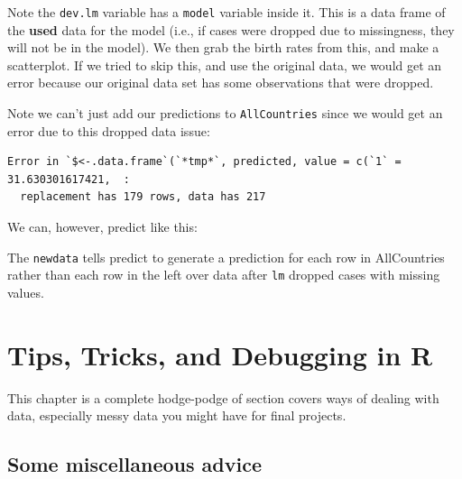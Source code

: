 \documentclass[
  letterpaper,
  DIV=11,
  numbers=noendperiod]{scrreprt}
\newenvironment{Shaded}{\begin{snugshade}}{\end{snugshade}}
\newcommand{\AttributeTok}[1]{\textcolor[rgb]{0.49,0.56,0.16}{#1}}
\newcommand{\FunctionTok}[1]{\textcolor[rgb]{0.02,0.16,0.49}{#1}}
\newcommand{\NormalTok}[1]{\textcolor[rgb]{0.00,0.44,0.13}{#1}}
\newcommand{\OtherTok}[1]{\textcolor[rgb]{0.00,0.44,0.13}{#1}}
\newcommand{\SpecialCharTok}[1]{\textcolor[rgb]{0.25,0.44,0.63}{#1}}
\begin{document}
Note the \texttt{dev.lm} variable has a \texttt{model} variable inside
it. This is a data frame of the \textbf{used} data for the model (i.e.,
if cases were dropped due to missingness, they will not be in the
model). We then grab the birth rates from this, and make a scatterplot.
If we tried to skip this, and use the original data, we would get an
error because our original data set has some observations that were
dropped.

Note we can't just add our predictions to \texttt{AllCountries} since we
would get an error due to this dropped data issue:

\begin{Shaded}
\end{Shaded}

\begin{verbatim}
Error in `$<-.data.frame`(`*tmp*`, predicted, value = c(`1` = 31.630301617421,  : 
  replacement has 179 rows, data has 217
\end{verbatim}

We can, however, predict like this:

\begin{Shaded}
\end{Shaded}

The \texttt{newdata} tells predict to generate a prediction for each row
in AllCountries rather than each row in the left over data after
\texttt{lm} dropped cases with missing values.

\hypertarget{tips-tricks-and-debugging-in-r}{%
\chapter{Tips, Tricks, and Debugging in
R}\label{tips-tricks-and-debugging-in-r}}

This chapter is a complete hodge-podge of section covers ways of dealing
with data, especially messy data you might have for final projects.

\hypertarget{some-miscellaneous-advice}{%
\section{Some miscellaneous advice}\label{some-miscellaneous-advice}}
\end{document}
